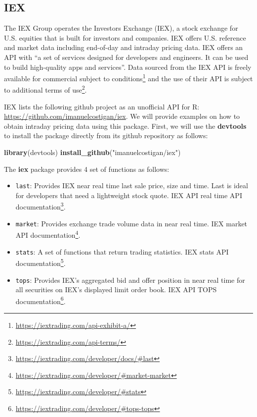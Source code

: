 \documentclass[]{book}
\newenvironment{Shaded}{\begin{snugshade}}{\end{snugshade}}
\newcommand{\KeywordTok}[1]{\textcolor[rgb]{0.13,0.29,0.53}{\textbf{#1}}}
\newcommand{\StringTok}[1]{\textcolor[rgb]{0.31,0.60,0.02}{#1}}
\newcommand{\NormalTok}[1]{#1}
\DeclareRobustCommand{\href}[2]{#2\footnote{\url{#1}}}
\providecommand{\tightlist}{%
  \setlength{\itemsep}{0pt}\setlength{\parskip}{0pt}}
\begin{document}
\subsection{IEX}\label{iex}

The IEX Group operates the Investors Exchange (IEX), a stock exchange
for U.S. equities that is built for investors and companies. IEX offers
U.S. reference and market data including end-of-day and intraday pricing
data. IEX offers an API with ``a set of services designed for developers
and engineers. It can be used to build high-quality apps and services''.
Data sourced from the IEX API is freely available for commercial subject
to \href{https://iextrading.com/api-exhibit-a/}{conditions} and the use
of their API is subject to additional
\href{https://iextrading.com/api-terms/}{terms of use}.

IEX lists the following github project as an unofficial API for R:
\url{https://github.com/imanuelcostigan/iex}. We will provide examples
on how to obtain intraday pricing data using this package. First, we
will use the \textbf{devtools} to install the package directly from its
github repository as follows:

\begin{Shaded}
\begin{Highlighting}[]
\KeywordTok{library}\NormalTok{(devtools)}
\KeywordTok{install_github}\NormalTok{(}\StringTok{"imanuelcostigan/iex"}\NormalTok{)}
\end{Highlighting}
\end{Shaded}

The \textbf{iex} package provides 4 set of functions as follows:

\begin{itemize}
\tightlist
\item
  \texttt{last}: Provides IEX near real time last sale price, size and
  time. Last is ideal for developers that need a lightweight stock
  quote. \href{https://iextrading.com/developer/docs/\#last}{IEX API
  real time API documentation}.
\item
  \texttt{market}: Provides exchange trade volume data in near real
  time. \href{https://iextrading.com/developer/\#market-market}{IEX
  market API documentation}.
\item
  \texttt{stats}: A set of functions that return trading statistics.
  \href{https://iextrading.com/developer/\#stats}{IEX stats API
  documentation}.
\item
  \texttt{tops}: Provides IEX's aggregated bid and offer position in
  near real time for all securities on IEX's displayed limit order book.
  \href{https://iextrading.com/developer/\#tops-tops}{IEX API TOPS
  documentation}.
\end{itemize}
\end{document}
